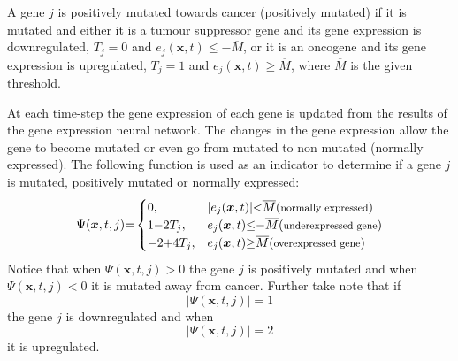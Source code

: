 \documentclass[\main/thesis.tex]{subfiles}
\begin{document}
A gene $j$ is positively mutated towards cancer (positively mutated) if it is mutated and either it is a tumour suppressor gene and its gene expression is downregulated, $T_j {=} 0$ and $e_j(\boldsymbol{x}, t) {\le} -\overline{M}$, or it is an oncogene and its gene expression is upregulated, $T_j {=} 1$ and $e_j(\boldsymbol{x}, t) {\ge} \overline{M}$, where $\overline{M}$ is the given threshold.

At each time-step the gene expression of each gene is updated from the results 
of the gene expression neural network. The changes in the gene expression allow 
the gene to become mutated or even go from mutated to non mutated (normally 
expressed). The following function is used as an indicator to determine if a gene $j$ is mutated, positively mutated or normally expressed:
\begin{equation}
\Psi(\boldsymbol{x}, t, j) {=} \begin{cases}
                             0, & |e_j(\boldsymbol{x}, t)| {<} \overline{M} 
                               (\text{{\footnotesize normally expressed}})\\
                             1 {-} 2T_j, & e_j(\boldsymbol{x}, t) {\le} {-}\overline{M}
                               (\text{{\footnotesize underexpressed gene}}) \\
                             {-}2 {+} 4T_j, & e_j(\boldsymbol{x}, t) {\ge} \overline{M} 
                               (\text{{\footnotesize overexpressed gene}})
                        \end{cases}
\label{eq:MutationFunc}
\end{equation}
Notice that when $\Psi(\boldsymbol{x}, t, j) {>} 0$ the gene $j$ is positively mutated and when $\Psi(\boldsymbol{x}, t, j) {<} 0$ it is mutated away from cancer. Further take note that if $$|\Psi(\boldsymbol{x}, t, j)| {=} 1$$ the gene $j$ is downregulated and when $$|\Psi(\boldsymbol{x}, t, j)| {=} 2$$ it is upregulated. 
\end{document}
